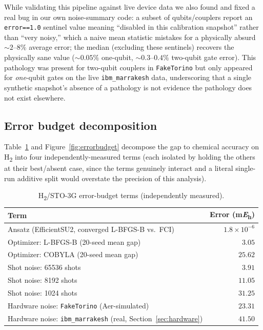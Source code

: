 \documentclass[11pt]{article}
\begin{document}
While validating this pipeline against live device data we also found and
fixed a real bug in our own noise-summary code: a subset of qubits/couplers
report an \texttt{error==1.0} sentinel value meaning ``disabled in this
calibration snapshot'' rather than ``very noisy,'' which a naive mean
statistic mistakes for a physically absurd $\sim\!2$--$8\%$ average error; the
median (excluding these sentinels) recovers the physically sane value
($\sim\!0.05\%$ one-qubit, $\sim\!0.3$--$0.4\%$ two-qubit gate error). This
pathology was present for two-qubit couplers in \texttt{FakeTorino} but only
appeared for \emph{one}-qubit gates on the live \texttt{ibm\_marrakesh} data,
underscoring that a single synthetic snapshot's absence of a pathology is not
evidence the pathology does not exist elsewhere.

\subsection{Error budget decomposition}
Table~\ref{tab:errorbudget} and Figure~\ref{fig:errorbudget} decompose the
gap to chemical accuracy on H\textsubscript{2} into four independently-measured
terms (each isolated by holding the others at their best/absent case, since
the terms genuinely interact and a literal single-run additive split would
overstate the precision of this analysis).

\begin{table}[htbp]
  \centering
  \caption{H\textsubscript{2}/STO-3G error-budget terms (independently measured).}
  \label{tab:errorbudget}
  \begin{tabular}{@{}lr@{}}
    \toprule
    Term & Error (\unit{\milli\hartree}) \\
    \midrule
    Ansatz (EfficientSU2, converged L-BFGS-B vs.\ FCI) & $1.8\times10^{-6}$ \\
    Optimizer: L-BFGS-B (20-seed mean gap) & $3.05$ \\
    Optimizer: COBYLA (20-seed mean gap) & $25.62$ \\
    Shot noise: 65536 shots & $3.91$ \\
    Shot noise: 8192 shots & $11.05$ \\
    Shot noise: 1024 shots & $31.25$ \\
    Hardware noise: \texttt{FakeTorino} (Aer-simulated) & $23.31$ \\
    Hardware noise: \texttt{ibm\_marrakesh} (real, Section~\ref{sec:hardware}) & $41.50$ \\
    \bottomrule
  \end{tabular}
\end{table}
\end{document}
